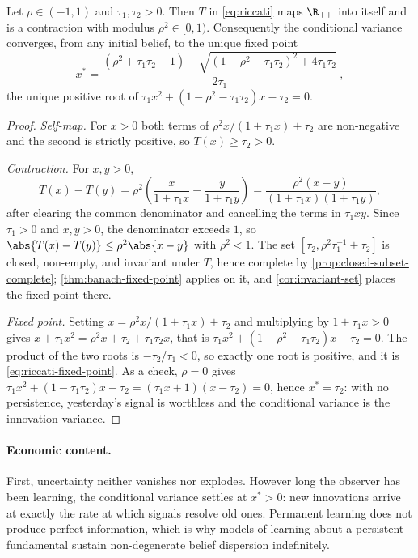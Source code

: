 \begin{proposition}\label{prop:riccati-contraction}
	Let $\rho\in(-1,1)$ and $\tau_1,\tau_2>0$. Then $T$ in \eqref{eq:riccati} maps
	$\R_{++}$ into itself and is a contraction with modulus $\rho^2\in[0,1)$.
	Consequently the conditional variance converges, from any initial belief, to the
	unique fixed point
	\begin{equation}\label{eq:riccati-fixed-point}
		x^\ast=\frac{(\rho^2+\tau_1\tau_2-1)+\sqrt{(1-\rho^2-\tau_1\tau_2)^2+4\tau_1\tau_2}}{2\tau_1}\,,
	\end{equation}
	the unique positive root of $\tau_1x^2+(1-\rho^2-\tau_1\tau_2)x-\tau_2=0$.
\end{proposition}

\begin{proof}
	\emph{Self-map.} For $x>0$ both terms of $\rho^2x/(1+\tau_1x)+\tau_2$ are
	non-negative and the second is strictly positive, so $T(x)\geq\tau_2>0$.

	\emph{Contraction.} For $x,y>0$,
	\[
		T(x)-T(y)=\rho^2\left(\frac{x}{1+\tau_1x}-\frac{y}{1+\tau_1y}\right)
		=\frac{\rho^2(x-y)}{(1+\tau_1x)(1+\tau_1y)},
	\]
	after clearing the common denominator and cancelling the terms in $\tau_1xy$.
	Since $\tau_1>0$ and $x,y>0$, the denominator exceeds $1$, so
	$\abs{T(x)-T(y)}\leq\rho^2\abs{x-y}$ with $\rho^2<1$. The set
	$[\tau_2,\rho^2\tau_1^{-1}+\tau_2]$ is closed, non-empty, and invariant under
	$T$, hence complete by \autoref{prop:closed-subset-complete};
	\autoref{thm:banach-fixed-point} applies on it, and
	\autoref{cor:invariant-set} places the fixed point there.

	\emph{Fixed point.} Setting $x=\rho^2x/(1+\tau_1x)+\tau_2$ and multiplying by
	$1+\tau_1x>0$ gives $x+\tau_1x^2=\rho^2x+\tau_2+\tau_1\tau_2x$, that is
	$\tau_1x^2+(1-\rho^2-\tau_1\tau_2)x-\tau_2=0$. The product of the two roots is
	$-\tau_2/\tau_1<0$, so exactly one root is positive, and it is
	\eqref{eq:riccati-fixed-point}. As a check, $\rho=0$ gives
	$\tau_1x^2+(1-\tau_1\tau_2)x-\tau_2=(\tau_1x+1)(x-\tau_2)=0$, hence
	$x^\ast=\tau_2$: with no persistence, yesterday's signal is worthless and the
	conditional variance is the innovation variance.
\end{proof}

\paragraph{Economic content.} First, uncertainty neither vanishes
nor explodes. However long the observer has been learning, the conditional
variance settles at $x^\ast>0$: new innovations arrive at exactly the rate at
which signals resolve old ones. Permanent learning does not produce perfect
information, which is why models of learning about a persistent fundamental
sustain non-degenerate belief dispersion indefinitely.

